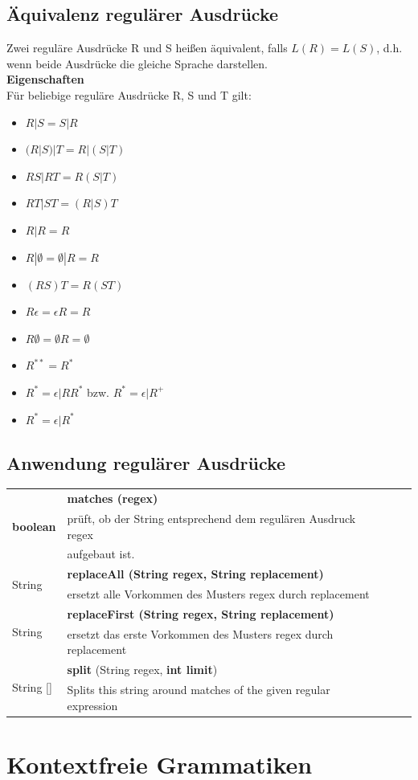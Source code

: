 \documentclass{scrreprt}
\begin{document}
\section{Äquivalenz regulärer Ausdrücke}
Zwei reguläre Ausdrücke R und S heißen äquivalent, falls $L(R) = L(S)$, d.h. wenn beide Ausdrücke die gleiche Sprache darstellen.
\\\textbf{Eigenschaften}
\\Für beliebige reguläre Ausdrücke R, S und T gilt:
\begin{itemize}
    \item $R|S = S|R$
    \item $(R|S)|T = R|(S|T)$
    \item $RS|RT = R(S|T)$
    \item $RT|ST = (R|S)T$
    \item $R|R = R$
    \item $R| \emptyset = \emptyset|R = R$
    \item $(RS)T = R(ST)$
    \item $R \epsilon = \epsilon R = R$
    \item $R \emptyset = \emptyset R = \emptyset$
    \item $R^{**} = R^{*}$
    \item $R^{*} = \epsilon | RR^{*}$ bzw. $R^{*} = \epsilon | R^{+}$
    \item $R^{*} = \epsilon | R^{*}$
\end{itemize}
\section{Anwendung regulärer Ausdrücke}
\begin{tabularx}{\textwidth}{p{}|l|X|l}
    \multirow{3}{*}{\textbf{boolean} }
            & \textbf{matches (regex)}\\
            & prüft, ob der String entsprechend dem regulären Ausdruck regex\\
            & aufgebaut ist.\\
    \hline
    \multirow{2}{*}{String}
            & \textbf{replaceAll (String regex, String replacement)}\\
            & ersetzt alle Vorkommen des Musters regex durch replacement\\
    \hline
    \multirow{2}{*}{String}
            & \textbf{replaceFirst (String regex, String replacement)}\\
            & ersetzt das erste Vorkommen des Musters regex durch replacement\\
    \hline
    \multirow{2}{*}{String []}
            & \textbf{split} (String regex, \textbf{int limit})\\
            & Splits this string around matches of the given regular expression\\
\end{tabularx}
\pagebreak
\chapter{Kontextfreie Grammatiken}
\end{document}
